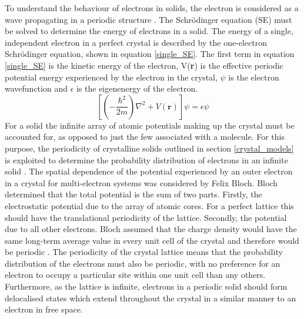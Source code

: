 \documentclass[11pt, twoside]{report}
\begin{document}
To understand the behaviour of electrons in solids, the electron is considered as a wave propagating in a periodic structure \cite{small_semiconductor1}. The Schr{\"o}dinger equation (SE) must be solved to determine the energy of electrons in a solid. 
The energy of a single, independent electron in a perfect crystal is described by the one-electron Schr{\"o}dinger equation, shown in equation \ref{single_SE}. The first term in equation \ref{single_SE} is the kinetic energy of the electron, V(\textbf{r}) is the effective periodic potential energy experienced by the electron in the crystal, $\psi$ is the electron wavefunction and $\epsilon$ is the eigenenergy of the electron.
\begin{equation} \label{single_SE}
\left[ \left(-\frac{\hbar^2}{2m}\right)\nabla^2 + V(\mathbf{r})\right]\psi = \epsilon \psi 
\end{equation}
For a solid the infinite array of atomic potentials making up the crystal must be accounted for, as opposed to just the few associated with a molecule. For this purpose, the periodicity of crystalline solids outlined in section \ref{crystal_models} is exploited to determine the probability distribution of electrons in an infinite solid \cite{Nelson3}. 
The spatial dependence of the potential experienced by an outer electron in a crystal for multi-electron systems was considered by Felix Bloch. Bloch determined that the total potential is the sum of two parts. Firstly, the electrostatic potential due to the array of atomic cores. For a perfect lattice this should have the translational periodicity of the lattice. Secondly, the potential due to all other electrons. Bloch assumed that the charge density would have the same long-term average value in every unit cell of the crystal and therefore would be periodic \cite{fund_semi}.
The periodicity of the crystal lattice means that the probability distribution of the electrons must also be periodic, with no preference for an electron to occupy a particular site within one unit cell than any others. Furthermore, as the lattice is infinite, electrons in a periodic solid should form delocalised states which extend throughout the crystal in a similar manner to an electron in free space.

\end{document}

